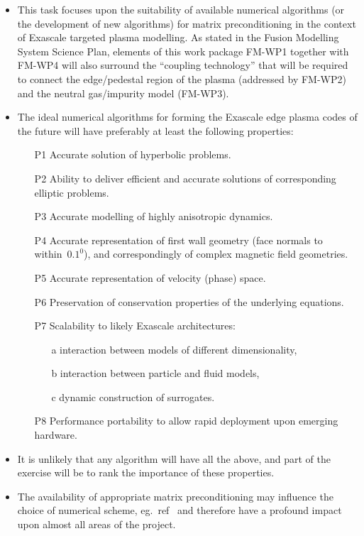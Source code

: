 \begin{itemize}
\item This task focuses upon the suitability of available numerical 
algorithms (or the development of new algorithms) for matrix preconditioning in the
context of Exascale targeted plasma modelling. As stated in the Fusion Modelling System
Science Plan, elements of this work package FM-WP1 together with FM-WP4 will also
surround the ``coupling technology'' that will be required to connect the 
edge/pedestal region of the plasma (addressed
by FM-WP2) and the neutral gas/impurity model (FM-WP3).

\item The ideal numerical algorithms for forming the Exascale edge plasma codes of 
the future will have preferably at least the following properties:
\begin{itemize}
\item[P1] Accurate solution of hyperbolic problems.
\item[P2] Ability to deliver efficient and accurate solutions of corresponding 
elliptic problems.
\item[P3] Accurate modelling of highly anisotropic dynamics. 
\item[P4] Accurate representation of first wall geometry (face normals to
within~$0.1^{0}$), and correspondingly of complex magnetic field geometries.
\item[P5] Accurate representation of velocity (phase) space.
\item[P6] Preservation of conservation properties of the underlying equations.
\item[P7] Scalability to likely Exascale architectures:
\begin{itemize}
\item[a] interaction between models of different dimensionality,
\item[b] interaction between particle and fluid models,
\item[c] dynamic construction of surrogates.
\end{itemize}
\item[P8] Performance portability to allow rapid deployment upon emerging hardware.
\end{itemize}

\item It is unlikely that any algorithm will have all the above, and part of the exercise
will be to rank the importance of these properties.

\item 
The availability of appropriate matrix preconditioning may influence the choice
of numerical scheme, eg.\ ref~\cite{Ya16ToCG} and therefore have a profound impact upon
almost all areas of the project.


\end{itemize}
